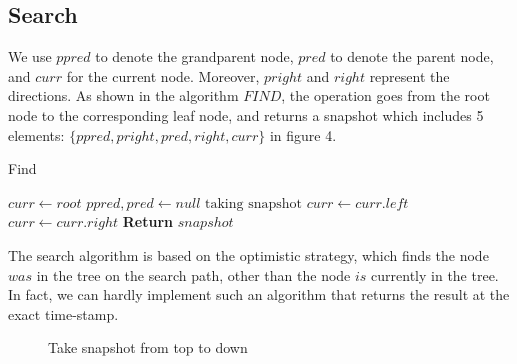 \documentclass{article}
\begin{document}
\subsection{Search}
We use $ppred$ to denote the grandparent node, $pred$ to denote the parent node, and $curr$ for the current node. Moreover, $pright$ and $right$ represent the directions. As shown in the algorithm $FIND$, the operation goes from the root node to the corresponding leaf node, and returns a snapshot which includes 5 elements: $\{ppred, pright, pred, right, curr\}$ in figure 4. 
\begin{algorithm}
\caption{Find}
\begin{algorithmic}[1]
    \State $curr \gets root$
    \State $ppred, pred \gets null$
        \State $\text{taking snapshot}$
            \State $curr \gets curr.left$
        \Else
            \State $curr \gets curr.right$
        \EndIf
    \EndWhile
    \State \textbf{Return} $snapshot$
\end{algorithmic}
\end{algorithm}
The search algorithm is based on the optimistic strategy, which finds the node $was$ in the tree on the search path, other than the node $is$ currently in the tree. In fact, we can hardly implement such an algorithm that returns the result at the exact time-stamp. 
\begin{figure}[htbp]
\centering
{}
\caption{Take snapshot from top to down}
\label{fig:my_label2}
\end{figure}
\end{document}
